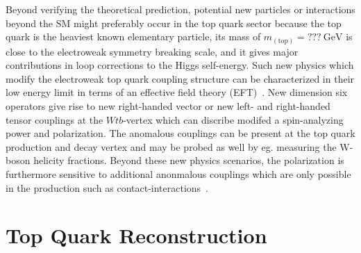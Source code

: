 \documentclass[a4paper]{jpconf}
\newcommand{\unit}[1]{\ensuremath{\mathrm{~#1}}}
\newcommand{\particle}[1]{\ensuremath{#1}}
\begin{document}
Beyond verifying the theoretical prediction, potential new particles or interactions beyond the SM might preferably occur in the top quark sector because the top quark is the heaviest known elementary particle, its mass of $m_{\mathrm{(top)}}=???\unit{GeV}$ is close to the electroweak symmetry breaking scale, and it gives major contributions in loop corrections to the Higgs self-energy. Such new physics which modify the electroweak top quark coupling structure can be characterized in their low energy limit in terms of an effective field theory (EFT)~\cite{jaaswpol}. New dimension six operators give rise to new right-handed vector or new left- and right-handed tensor couplings at the $\particle{Wtb}$-vertex which can discribe modifed a spin-analyzing power and polarization. The anomalous couplings can be present at the top quark production and decay vertex and may be probed as well by eg. measuring the W-boson helicity fractions. Beyond these new physics scenarios, the polarization is furthermore sensitive to additional anonmalous couplings which are only possible in the production such as contact-interactions~\cite{fabian}.

\section{Top Quark Reconstruction}
\end{document}
